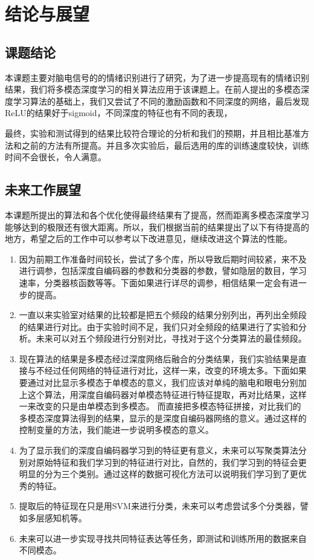 
\chapter{结论与展望}
\label{chap:chap8}
\section{课题结论}{
	本课题主要对脑电信号的的情绪识别进行了研究，为了进一步提高现有的情绪识别结果，我们将多模态深度学习的相关算法应用于该课题上。在前人提出的多模态深度学习算法的基础上，我们又尝试了不同的激励函数和不同深度的网络，最后发现ReLU的结果好于sigmoid，不同深度的特征也有不同的表现，
	
	最终，实验和测试得到的结果比较符合理论的分析和我们的预期，并且相比基准方法和之前的方法有所提高。并且多次实验后，最后选用的库的训练速度较快，训练时间不会很长，令人满意。
}
\section{未来工作展望}

	本课题所提出的算法和各个优化使得最终结果有了提高，然而距离多模态深度学习能够达到的极限还有很大距离。所以，我们根据当前的结果提出了以下有待提高的地方，希望之后的工作中可以参考以下改进意见，继续改进这个算法的性能。
	\begin{enumerate}
		\item 因为前期工作准备时间较长，尝试了多个库，所以导致后期时间较紧，来不及进行调参，包括深度自编码器的参数和分类器的参数，譬如隐层的数目，学习速率，分类器核函数等等。下面如果进行详尽的调参，相信结果一定会有进一步的提高。
		\item 一直以来实验室对结果的比较都是把五个频段的结果分别列出，再列出全频段的结果进行对比。由于实验时间不足，我们只对全频段的结果进行了实验和分析。未来可以对五个频段进行分别对比，寻找对于这个分类算法的最佳频段。
		\item 现在算法的结果是多模态经过深度网络后融合的分类结果，我们实验结果是直接与不经过任何网络的特征进行对比，这样一来，改变的环境太多。下面如果要通过对比显示多模态于单模态的意义，我们应该对单纯的脑电和眼电分别加上这个算法，用深度自编码器对单模态特征进行特征提取，再对比结果，这样一来改变的只是由单模态到多模态。 而直接把多模态特征拼接，对比我们的多模态深度算法得到的结果，显示的是深度自编码器网络的意义。通过这样的控制变量的方法，我们能进一步说明多模态的意义。
		\item 为了显示我们的深度自编码器学习到的特征更有意义，未来可以写聚类算法分别对原始特征和我们学习到的特征进行对比，自然的，我们学习到的特征会更明显的分为三个类别。通过这样的数据可视化方法可以说明我们学习到了更优秀的特征。
		\item 提取后的特征现在只是用SVM来进行分类，未来可以考虑尝试多个分类器，譬如多层感知机等。
		\item 未来可以进一步实现寻找共同特征表达等任务，即测试和训练所用的数据来自不同模态。
	\end{enumerate}